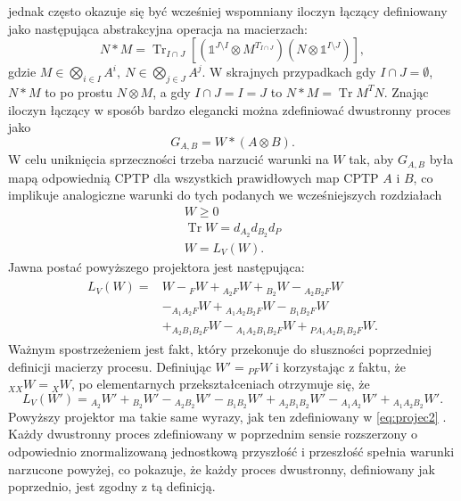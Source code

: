 \documentclass[10pt]{article} %
\DeclareMathOperator{\Trs}{Tr}
\newcommand{\I}{\mathbb{1}}
\begin{document}
jednak często okazuje się być wcześniej wspomniany iloczyn łączący definiowany jako następująca abstrakcyjna operacja na macierzach:
\begin{equation}
N * M = \Trs_{I\cap J}\left[ (\I^{J\setminus I} \otimes M^{T_{I\cap J}})(N \otimes \I^{I\setminus J})\right],
\end{equation}
gdzie $M \in \bigotimes_{i \in I} A^i,~N \in \bigotimes_{j \in J} A^j$. W skrajnych przypadkach gdy $I \cap J = \emptyset$, $N*M$ to po prostu $N \otimes M$, a
gdy $I \cap J = I = J$ to $N * M = \Trs M^T N$.
Znając iloczyn łączący w sposób bardzo elegancki można zdefiniować dwustronny proces jako
\begin{equation}
G_{A,B} = W * (A \otimes B).
\end{equation}
W celu uniknięcia sprzeczności trzeba narzucić warunki na $W$ tak, aby $G_{A,B}$ była mapą odpowiednią CPTP dla wszystkich prawidłowych map CPTP $A$ i $B$, co implikuje analogiczne warunki do tych podanych we wcześniejszych rozdziałach
\begin{gather}
W \geq 0 \\
\Trs W = d_{A_2}d_{B_2}d_P \\
W = L_V(W).
\end{gather} 
Jawna postać powyższego projektora jest następująca:
\begin{align}
\begin{split}
L_V(W) =& W -{}_FW + {}_{A_2F}W + {}_{B_2}W - {}_{A_2B_2F}W\\ &- {}_{A_1A_2F}W + {}_{A_1A_2B_2F}W - {}_{B_1B_2F}W \\&+ {}_{A_2B_1B_2F}W - {}_{A_1A_2B_1B_2F}W + {}_{PA_1A_2B_1B_2F}W.
\end{split}
\end{align}
Ważnym spostrzeżeniem jest fakt, który przekonuje do słuszności poprzedniej definicji macierzy procesu. Definiując $W' = {}_{PF}W$ i korzystając z faktu, że
${}_{XX}W = {}_{X}W$, po elementarnych przekształceniach otrzymuje się, że
\begin{equation}
L_V(W') = {}_{A_2}W' + {}_{B_2}W' - {}_{A_2B_2}W' - {}_{B_1B_2}W' + {}_{A_2B_1B_2}W' - {}_{A_1A_2}W' + {}_{A_1A_2B_2}W'.
\end{equation}
Powyższy projektor ma takie same wyrazy, jak ten zdefiniowany w \eqref{eq:projec2} .
Każdy dwustronny proces zdefiniowany w poprzednim sensie rozszerzony o odpowiednio znormalizowaną jednostkową przyszłość i przeszłość spełnia warunki narzucone powyżej, co pokazuje, że każdy proces dwustronny, definiowany jak poprzednio, jest zgodny z tą definicją.
\end{document}
